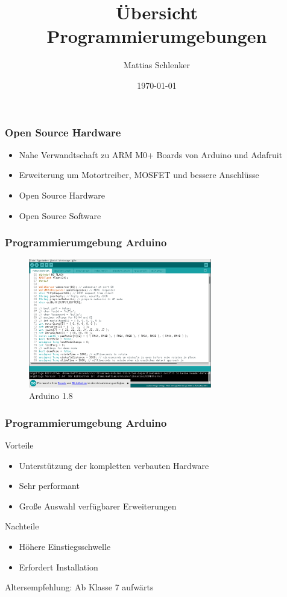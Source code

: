 \documentclass{beamer}
\title{Übersicht Programmierumgebungen}
\author{Mattias Schlenker}
\institute{TÖP Rabutz}
\date{ \today }
\begin{document}
\frame{\titlepage}

\begin{frame}
\frametitle{Open Source Hardware}
\begin{itemize}
\item Nahe Verwandtschaft zu ARM M0+ Boards von Arduino und Adafruit
\item Erweiterung um Motortreiber, MOSFET und bessere Anschlüsse
\item Open Source Hardware
\item Open Source Software 
\end{itemize}
\end{frame}


\begin{frame}
\frametitle{Programmierumgebung Arduino}

 \begin{figure}
  \includegraphics[width=8cm]{arduino.png}
  \caption{Arduino 1.8}
  \label{fig:arduino}
  \end{figure}
\end{frame}


\begin{frame}
\frametitle{Programmierumgebung Arduino}

Vorteile

\begin{itemize}
\item Unterstützung der kompletten verbauten Hardware
\item Sehr performant
\item Große Auswahl verfügbarer Erweiterungen
\end{itemize}

Nachteile 

\begin{itemize}
\item Höhere Einstiegsschwelle
\item Erfordert Installation
\end{itemize}

Altersempfehlung: Ab Klasse 7 aufwärts 

\end{frame}
\end{document}
